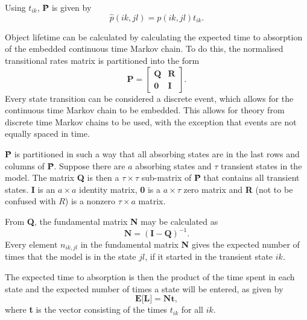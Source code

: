 \documentclass[10pt,a4paper,conference]{IEEEtran}
\begin{document}
Using $t_{ik}$, \textbf{\^{P}} is given by
%
\begin{equation} \label{eq_markov_normalisation}
    \hat{p}(ik, jl) = p(ik, jl) t_{ik}.
\end{equation}

Object lifetime can be calculated by calculating the expected time to absorption of the embedded continuous time Markov chain. To do this, the normalised transitional rates matrix is partitioned into the form
%
\begin{equation} \label{matrix_partition}
    \textbf{\^{P}} = \left[\begin{array}{c|c}
                   \textbf{Q} & \textbf{R} \\
                   \hline
                   \textbf{0} & \textbf{I}
                 \end{array}\right].
\end{equation}
%
Every state transition can be considered a discrete event, which allows for the continuous time Markov chain to be embedded. This allows for theory from discrete time Markov chains to be used, with the exception that events are not equally spaced in time.

\textbf{\^{P}} is partitioned in such a way that all absorbing states are in the last rows and columns of \textbf{\^{P}}. Suppose there are $a$ absorbing states and $\tau$ transient states in the model. The matrix \textbf{Q} is then a $\tau\times\tau$ sub-matrix of \textbf{\^{P}} that contains all transient states. \textbf{I} is an $a \times a$ identity matrix, \textbf{0} is a $a\times\tau$ zero matrix and \textbf{R} (not to be confused with $R$) is a nonzero $\tau\times a$ matrix.

From \textbf{Q}, the fundamental matrix \textbf{N} may be calculated as \cite{grinstead1997introduction_probability}
%
\begin{equation} \label{eq_fundamental_mat}
    \textbf{N} = (\textbf{I} - \textbf{Q})^{-1}.
\end{equation}
%
Every element $n_{ik,jl}$ in the fundamental matrix \textbf{N} gives the expected number of times that the model is in the state $jl$, if it started in the transient state $ik$.

The expected time to absorption is then the product of the time spent in each state and the expected number of times a state will be entered, as given by
%
\begin{equation} \label{expected_lifetime}
    \textbf{E[L]} = \textbf{Nt},
\end{equation}
%
where \textbf{t} is the vector consisting of the times $t_{ik}$ for all $ik$.
\end{document}
